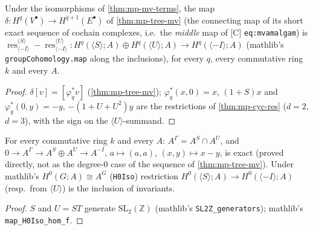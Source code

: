 \begin{theorem}\label{thm:mp-mv-resres}
  \leanok
  Under the isomorphisms of \ref{thm:mp-mv-terms}, the map $\delta\colon H^q(V^\bullet)\to H^{q+1}(E^\bullet)$ of
  \ref{thm:mp-tree-mv} (the connecting map of its short exact sequence of cochain complexes, i.e.\ the \emph{middle} map of
  [C] \texttt{eq:mvamalgam}) is
  $\operatorname{res}^{\langle S\rangle}_{\langle-I\rangle}-\operatorname{res}^{\langle U\rangle}_{\langle-I\rangle}\colon
  H^q(\langle S\rangle;A)\oplus H^q(\langle U\rangle;A)\to H^q(\langle-I\rangle;A)$ (mathlib's \texttt{groupCohomology.map} along
  the inclusions), for every $q$, every commutative ring $k$ and every $A$.
\end{theorem}
\begin{proof}
  \leanok
  $\delta[v]=[\varphi^*_qv]$ (\ref{thm:mp-tree-mv}); $\varphi^*_q(x,0)=x$, $(1+S)x$ and $\varphi^*_q(0,y)=-y$, $-(1+U+U^2)y$ are the
  restrictions of \ref{thm:mp-cyc-res} ($d=2$, $d=3$), with the sign on the $\langle U\rangle$-summand.
\end{proof}

\begin{theorem}\label{thm:mp-mv-low}
  \leanok
  For every commutative ring $k$ and every $A$: $A^\Gamma=A^S\cap A^U$, and $0\to A^\Gamma\to A^S\oplus A^U\to A^{-I}$,
  $a\mapsto(a,a)$, $(x,y)\mapsto x-y$, is exact (proved directly, not as the degree-$0$ case of the sequence of
  \ref{thm:mp-tree-mv}).  Under mathlib's $H^0(G;A)\cong A^G$ (\texttt{H0Iso}) restriction
  $H^0(\langle S\rangle;A)\to H^0(\langle-I\rangle;A)$ (resp.\ from $\langle U\rangle$) is the inclusion of invariants.
\end{theorem}
\begin{proof}
  \leanok
  $S$ and $U=ST$ generate $\mathrm{SL}_2(\mathbb Z)$ (mathlib's \texttt{SL2Z\_generators}); mathlib's \texttt{map\_H0Iso\_hom\_f}.
\end{proof}

